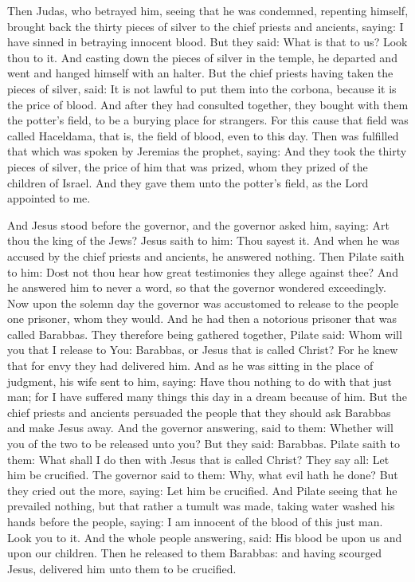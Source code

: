 Then Judas, who betrayed him, seeing that he was condemned, repenting himself,
brought back the thirty pieces of silver to the chief priests and ancients,
saying: I have sinned in betraying innocent blood. But they said: What is that
to us? Look thou to it.  And casting down the pieces of silver in the temple,
he departed and went and hanged himself with an halter.  But the chief priests
having taken the pieces of silver, said: It is not lawful to put them into the
corbona, because it is the price of blood.   And after they
had consulted together, they bought with them the potter's field, to be a
burying place for strangers.  For this cause that field was called Haceldama,
that is, the field of blood, even to this day.  Then was fulfilled that which
was spoken by Jeremias the prophet, saying: And they took the thirty pieces of
silver, the price of him that was prized, whom they prized of the children of
Israel.  And they gave them unto the potter's field, as the Lord appointed to
me.  

And Jesus stood before the governor, and the governor asked him, saying: Art
thou the king of the Jews? Jesus saith to him: Thou sayest it.  And when he was
accused by the chief priests and ancients, he answered nothing.  Then Pilate
saith to him: Dost not thou hear how great testimonies they allege against
thee?  And he answered him to never a word, so that the governor wondered
exceedingly.  Now upon the solemn day the governor was accustomed to release to
the people one prisoner, whom they would.  And he had then a notorious prisoner
that was called Barabbas.  They therefore being gathered together, Pilate said:
Whom will you that I release to You: Barabbas, or Jesus that is called Christ?
For he knew that for envy they had delivered him.  And as he was sitting in the
place of judgment, his wife sent to him, saying: Have thou nothing to do with
that just man; for I have suffered many things this day in a dream because of
him.  But the chief priests and ancients persuaded the people that they should
ask Barabbas and make Jesus away.  And the governor answering, said to them:
Whether will you of the two to be released unto you? But they said: Barabbas.
Pilate saith to them: What shall I do then with Jesus that is called Christ?
They say all: Let him be crucified.  The governor said to them: Why, what evil
hath he done? But they cried out the more, saying: Let him be crucified.  And
Pilate seeing that he prevailed nothing, but that rather a tumult was made,
taking water washed his hands before the people, saying: I am innocent of the
blood of this just man. Look you to it.  And the whole people answering, said:
His blood be upon us and upon our children.  Then he released to them Barabbas:
and having scourged Jesus, delivered him unto them to be crucified.  

